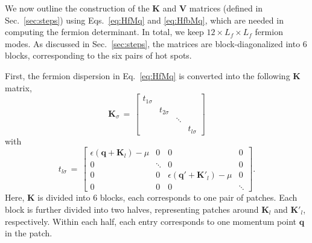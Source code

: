 \documentclass[aps,prx,twocolumn,superscriptaddress,showpacs,floatfix]{revtex4-1}
\begin{document}
We now outline the construction of the $\mathbf{K}$ and $\mathbf{V}$ matrices (defined in Sec.~\ref{sec:steps}) using Eqs.~\eqref{eq:HfMq} and \eqref{eq:HfbMq}, which are needed in computing the fermion determinant.
In total, we keep $12\times L_f\times L_f$ fermion modes.
As discussed in Sec.~\ref{sec:steps}, the matrices are block-diagonalized into 6 blocks, corresponding to the six pairs of hot spots.

First, the fermion dispersion in Eq.~\eqref{eq:HfMq} is converted into the following $\mathbf{K}$ matrix,
\begin{equation}
\mathbf K_{\sigma}\,=\,\left[\begin{array}{cccc}
t_{1\sigma}\\
 & t_{2\sigma}\\
 &  & \ddots\\
 &  &  & t_{l\sigma}
\end{array}\right]
\label{eq:Tmatrix}
\end{equation}
with
\begin{equation}
t_{l\sigma}\,=\,\begin{bmatrix}\epsilon(\mathbf{q}+\mathbf{K}_{l})-\mu & 0 & 0 & 0\\
0 & \ddots & 0 & 0\\
0 & 0 & \epsilon(\mathbf{q'}+\mathbf{K'}_l)-\mu & 0\\
0 & 0 & 0 & \ddots
\end{bmatrix}.
\label{eq:tlmatrix}
\end{equation}
Here, $\mathbf{K}$ is divided into 6 blocks, each corresponds to one pair of patches.
Each block is further divided into two halves, representing patches around $\mathbf{K}_l$ and $\mathbf{K'}_l$, respectively.
Within each half, each entry corresponds to one momentum point $\mathbf{q}$ in the patch.

\end{document}
